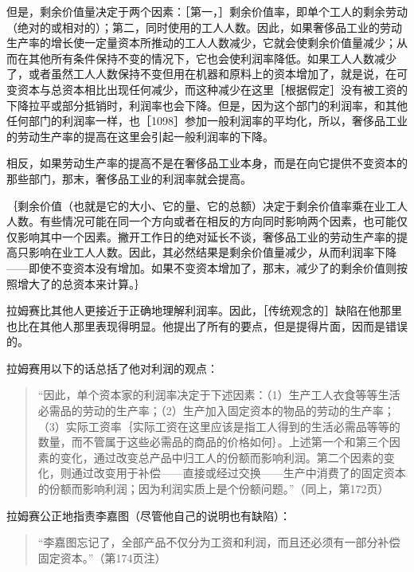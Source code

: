 但是，剩余价值量决定于两个因素：［第一，］剩余价值率，即单个工人的剩余劳动（绝对的或相对的）；第二，同时使用的工人人数。因此，如果奢侈品工业的劳动生产率的增长使一定量资本所推动的工人人数减少，它就会使剩余价值量减少；从而在其他所有条件保持不变的情况下，它也会使利润率降低。如果工人人数减少了，或者虽然工人人数保持不变但用在机器和原料上的资本增加了，就是说，在可变资本与总资本相比出现任何减少，而这种减少在这里［根据假定］没有被工资的下降拉平或部分抵销时，利润率也会下降。但是，因为这个部门的利润率，和其他任何部门的利润率一样，也［1098］参加一般利润率的平均化，所以，奢侈品工业的劳动生产率的提高在这里会引起一般利润率的下降。

相反，如果劳动生产率的提高不是在奢侈品工业本身，而是在向它提供不变资本的那些部门，那末，奢侈品工业的利润率就会提高。

｛剩余价值（也就是它的大小、它的量、它的总额）决定于剩余价值率乘在业工人人数。有些情况可能在同一个方向或者在相反的方向同时影响两个因素，也可能仅仅影响其中一个因素。撇开工作日的绝对延长不谈，奢侈品工业的劳动生产率的提高只影响在业工人人数。因此，其必然结果是剩余价值量减少，从而利润率下降——即使不变资本没有增加。如果不变资本增加了，那末，减少了的剩余价值则按照增大了的总资本来计算。｝


拉姆赛比其他人更接近于正确地理解利润率。因此，［传统观念的］缺陷在他那里也比在其他人那里表现得明显。他提出了所有的要点，但是提得片面，因而是错误的。

拉姆赛用以下的话总括了他对利润的观点：

\begin{quote}{“因此，单个资本家的利润率决定于下述因素：（1）生产工人衣食等等生活必需品的劳动的生产率；（2）生产加入固定资本的物品的劳动的生产率；（3）实际工资率｛实际工资在这里应该是指工人得到的生活必需品等等的数量，而不管属于这些必需品的商品的价格如何｝。上述第一个和第三个因素的变化，通过改变总产品中归工人的份额而影响利润。第二个因素的变化，则通过改变用于补偿——直接或经过交换——生产中消费了的固定资本的份额而影响利润；因为利润实质上是个份额问题。”（同上，第172页）}\end{quote}

拉姆赛公正地指责李嘉图（尽管他自己的说明也有缺陷）：

\begin{quote}{“李嘉图忘记了，全部产品不仅分为工资和利润，而且还必须有一部分补偿固定资本。”（第174页注）}\end{quote}



